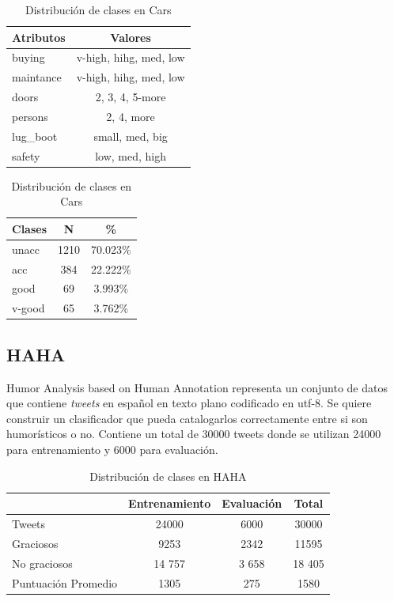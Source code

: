 \begin{table}[ht]
    \centering
    \parbox{.45\linewidth}{
    \begin{tabular} { |l|c| }
        \hline
        Atributos & Valores \\
        \hline
        \hline
        buying & v-high, hihg, med, low \\
        \hline
        maintance &  v-high, hihg, med, low\\
        \hline
        doors & 2, 3, 4, 5-more\\
        \hline
        persons & 2, 4, more\\
        \hline
        lug\_boot & small, med, big\\
        \hline
        safety & low, med, high\\
        \hline
    \end{tabular}
    \caption{Tipos de Atributos en Cars}
    \label{implementation:table:cars:attributes}
    }
    \qquad
    \parbox[t]{.45\linewidth}{
    \begin{tabular} {|l|c|c|}
        \hline
        Clases & N & \% \\
        \hline
        \hline
        unacc & 1210 & 70.023\%\\
        \hline
        acc & 384 & 22.222\%\\
        \hline
        good & 69 & 3.993\%\\
        \hline
        v-good & 65 & 3.762\%\\
        \hline
    \end{tabular}
    \caption{Distribuci\'on de clases en Cars}
    \label{implementation:table:cars:classes}
    }
\end{table}

\subsection{HAHA}
Humor Analysis based on Human Annotation  representa un conjunto de datos que contiene \textit{tweets} en espa\~nol en texto plano codificado en utf-8. Se quiere construir un clasificador que pueda catalogarlos correctamente entre si son humor\'isticos o no. Contiene un total de 30000 tweets donde se utilizan 24000 para entrenamiento y 6000 para evaluaci\'on.

\begin{table}[ht]
    \centering
    \begin{tabular} {|l||c|c|c|}
        \hline
        & Entrenamiento & Evaluaci\'on & Total \\
        \hline
        \hline
        Tweets & 24000 & 6000 & $30000$\\
        \hline
        Graciosos & 9253 & 2342 & 11595\\
        \hline
        No graciosos & 14 757 & 3 658 & 18 405\\
        \hline
        Puntuaci\'on Promedio & 1305 & 275 & 1580\\
        \hline
    \end{tabular}
    \caption{Distribuci\'on de clases en HAHA}
    \label{implementation:table:haha}
\end{table}

